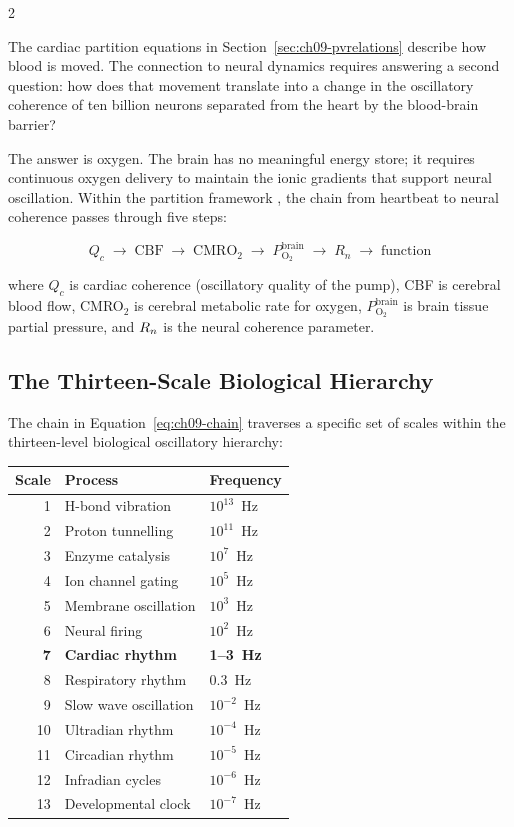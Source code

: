 \begin{multicols}{2}

The cardiac partition equations in Section~\ref{sec:ch09-pvrelations}
describe how blood is moved. The connection to neural dynamics requires
answering a second question: how does that movement translate into a
change in the oscillatory coherence of ten billion neurons separated
from the heart by the blood-brain barrier?

The answer is oxygen. The brain has no meaningful energy store; it
requires continuous oxygen delivery to maintain the ionic gradients
that support neural oscillation. Within the partition framework
\citep{sachikonye2024_cardioneural}, the chain from heartbeat to
neural coherence passes through five steps:

\begin{equation}
Q_c \;\to\; \mathrm{CBF} \;\to\; \mathrm{CMRO}_2 \;\to\;
P_{\mathrm{O}_2}^{\mathrm{brain}} \;\to\; R_n \;\to\; \text{function}
\label{eq:ch09-chain}
\end{equation}

where $Q_c$ is cardiac coherence (oscillatory quality of the pump),
CBF is cerebral blood flow, CMRO$_2$ is cerebral metabolic rate for
oxygen, $P_{\mathrm{O}_2}^{\mathrm{brain}}$ is brain tissue partial
pressure, and $R_n$ is the neural coherence parameter.

\columnbreak

\subsection{The Thirteen-Scale Biological Hierarchy}

The chain in Equation~\eqref{eq:ch09-chain} traverses a specific set
of scales within the thirteen-level biological oscillatory hierarchy:

\begin{center}
\begin{tabular}{rll}
\toprule
Scale & Process & Frequency \\
\midrule
1 & H-bond vibration & $10^{13}$~Hz \\
2 & Proton tunnelling & $10^{11}$~Hz \\
3 & Enzyme catalysis & $10^7$~Hz \\
4 & Ion channel gating & $10^5$~Hz \\
5 & Membrane oscillation & $10^3$~Hz \\
6 & Neural firing & $10^2$~Hz \\
\textbf{7} & \textbf{Cardiac rhythm} & \textbf{1--3~Hz} \\
8 & Respiratory rhythm & $0.3$~Hz \\
9 & Slow wave oscillation & $10^{-2}$~Hz \\
10 & Ultradian rhythm & $10^{-4}$~Hz \\
11 & Circadian rhythm & $10^{-5}$~Hz \\
12 & Infradian cycles & $10^{-6}$~Hz \\
13 & Developmental clock & $10^{-7}$~Hz \\
\bottomrule
\end{tabular}
\end{center}


\end{multicols}
